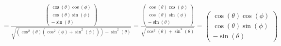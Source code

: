 \documentclass[reprint,amsmath,amssymb,aps, floatfix]{revtex4-2}
\begin{document}
\begin{widetext}
\begin{equation}
\begin{aligned}
        & = \frac{\begin{pmatrix} \cos(\theta)\cos(\phi) \\ \cos(\theta)\sin(\phi) \\ -\sin(\theta) \end{pmatrix}}{\sqrt{\left(\cos^2(\theta)\left(\cos^2(\phi) + \sin^2(\phi)\right)\right) + \sin^2(\theta)}}
        = \frac{\begin{pmatrix} \cos(\theta)\cos(\phi) \\ \cos(\theta)\sin(\phi) \\ -\sin(\theta) \end{pmatrix}}{\sqrt{\cos^2(\theta)+\sin^2(\theta)}}
        = \begin{pmatrix} \cos(\theta)\cos(\phi) \\ \cos(\theta)\sin(\phi) \\ -\sin(\theta) \end{pmatrix}
    \end{aligned}
    \label{equ:etheta}
\end{equation}


\end{widetext}
\end{document}
